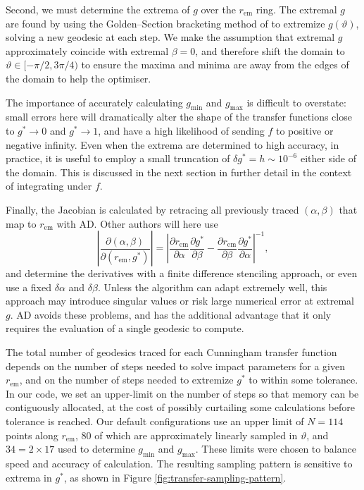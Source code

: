 \documentclass[fleqn,usenatbib]{mnras}
\newcommand{\pderiv}[2]{\frac{\partial #1}{\partial #2}}
\newcommand{\rhoem}{r_\text{em}}
\begin{document}
Second, we must determine the extrema of $g$ over the $\rhoem$ ring. The
extremal $g$ are found by using the Golden--Section bracketing method of
\cite{Optim.jl-2018} to extremize $g(\vartheta)$, solving a new geodesic at each
step. We make the assumption that extremal $g$ approximately coincide with
extremal $\beta = 0$, and therefore shift the domain to $\vartheta \in [ -\pi/2,
3\pi/4)$ to ensure the maxima and minima are away from the edges of the domain
to help the optimiser.

The importance of accurately calculating $g_\text{min}$ and $g_\text{max}$ is
difficult to overstate: small errors here will dramatically alter the shape of
the transfer functions close to $g^\ast \rightarrow 0$ and $g^\ast \rightarrow
1$, and have a high likelihood of sending $f$ to positive or negative infinity.
Even when the extrema are determined to high accuracy, in practice, it is useful
to employ a small truncation of $\delta g^\ast = h \sim 10^{-6}$ either side of
the domain. This is discussed in the next section in further detail in the
context of integrating under $f$.

Finally, the Jacobian is calculated by retracing all previously traced $(\alpha,
\beta)$ that map to $\rhoem$ with AD. Other authors will here use
\begin{equation}
    \left\lvert
    \pderiv{(\alpha, \beta)}{(\rhoem, g^\ast)}
    \right\rvert
    =
    \left\lvert
    \pderiv{\rhoem}{\alpha}\pderiv{g^\ast}{\beta}
    -
    \pderiv{\rhoem}{\beta}\pderiv{g^\ast}{\alpha}
    \right\rvert^{-1},
\end{equation}
and determine the derivatives with a finite difference stenciling approach, or
even use a fixed $\delta \alpha$ and $\delta \beta$. Unless the algorithm can
adapt extremely well, this approach may introduce singular values or risk large
numerical error at extremal $g$. AD avoids these problems, and has the
additional advantage that it only requires the evaluation of a single geodesic
to compute.

The total number of geodesics traced for each Cunningham transfer function
depends on the number of steps needed to solve impact parameters for a given
$\rhoem$, and on the number of steps needed to extremize $g^\ast$ to within
some tolerance. In our code, we set an upper-limit on the number of steps so
that memory can be contiguously allocated, at the cost of possibly curtailing
some calculations before tolerance is reached. Our default configurations use an
upper limit of $N = 114$ points along $\rhoem$, $80$ of which are
approximately linearly sampled in $\vartheta$, and $34 = 2 \times 17$ used to
determine $g_\text{min}$ and $g_\text{max}$. These limits were chosen to balance
speed and accuracy of calculation. The resulting sampling pattern is sensitive
to extrema in $g^\ast$, as shown in Figure \ref{fig:transfer-sampling-pattern}.
\end{document}
